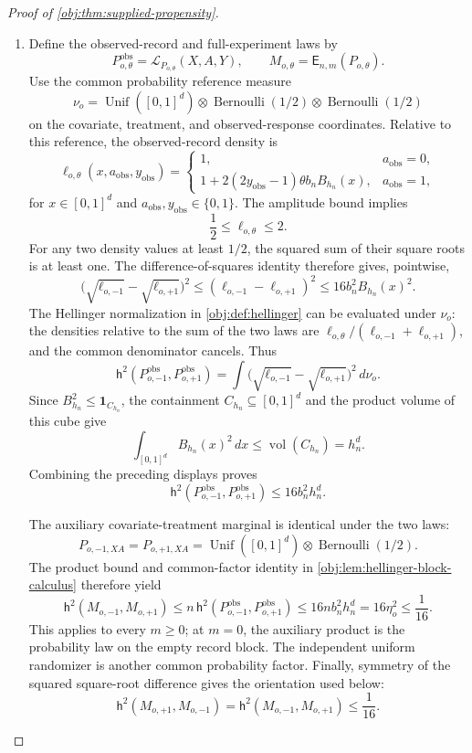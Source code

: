 \documentclass[11pt]{article}
\begin{document}
\begin{proof}[Proof of \cref{obj:thm:supplied-propensity}]
\begin{enumerate}
\item Define the observed-record and full-experiment laws by
\[
P_{o,\theta}^{\mathrm{obs}}
=\mathcal L_{P_{o,\theta}}(X,A,Y),
\qquad
M_{o,\theta}=\mathsf E_{n,m}(P_{o,\theta}).
\]
Use the common probability reference measure
\[
\nu_o
=
\operatorname{Unif}([0,1]^d)
\otimes\operatorname{Bernoulli}(1/2)
\otimes\operatorname{Bernoulli}(1/2)
\]
on the covariate, treatment, and observed-response coordinates. Relative to this reference, the observed-record density is
\[
\ell_{o,\theta}(x,a_{\mathrm{obs}},y_{\mathrm{obs}})
=
\begin{cases}
1,&a_{\mathrm{obs}}=0,\\
1+2(2y_{\mathrm{obs}}-1)\theta b_nB_{h_n}(x),
&a_{\mathrm{obs}}=1,
\end{cases}
\]
for \(x\in[0,1]^d\) and \(a_{\mathrm{obs}},y_{\mathrm{obs}}\in\{0,1\}\). The amplitude bound implies
\[
\frac12\le\ell_{o,\theta}\le2.
\]
For any two density values at least \(1/2\), the squared sum of their square roots is at least one. The difference-of-squares identity therefore gives, pointwise,
\[
\bigl(\sqrt{\ell_{o,-1}}-\sqrt{\ell_{o,+1}}\bigr)^2
\le
(\ell_{o,-1}-\ell_{o,+1})^2
\le16b_n^2B_{h_n}(x)^2.
\]
The Hellinger normalization in \cref{obj:def:hellinger} can be evaluated under \(\nu_o\): the densities relative to the sum of the two laws are
\(\ell_{o,\theta}/(\ell_{o,-1}+\ell_{o,+1})\), and the common denominator cancels. Thus
\[
\mathsf h^2(P_{o,-1}^{\mathrm{obs}},P_{o,+1}^{\mathrm{obs}})
=
\int
\bigl(\sqrt{\ell_{o,-1}}-\sqrt{\ell_{o,+1}}\bigr)^2\,d\nu_o.
\]
Since \(B_{h_n}^2\le\mathbf1_{C_{h_n}}\), the containment
\(C_{h_n}\subseteq[0,1]^d\) and the product volume of this cube give
\[
\int_{[0,1]^d}B_{h_n}(x)^2\,dx
\le\operatorname{vol}(C_{h_n})
=h_n^d.
\]
Combining the preceding displays proves
\[
\mathsf h^2(P_{o,-1}^{\mathrm{obs}},P_{o,+1}^{\mathrm{obs}})
\le16b_n^2h_n^d.
\]

The auxiliary covariate-treatment marginal is identical under the two laws:
\[
P_{o,-1,XA}=P_{o,+1,XA}
=
\operatorname{Unif}([0,1]^d)\otimes\operatorname{Bernoulli}(1/2).
\]
The product bound and common-factor identity in
\cref{obj:lem:hellinger-block-calculus} therefore yield
\[
\mathsf h^2(M_{o,-1},M_{o,+1})
\le
n\,\mathsf h^2(P_{o,-1}^{\mathrm{obs}},P_{o,+1}^{\mathrm{obs}})
\le16n b_n^2h_n^d
=16\eta_o^2
\le\frac1{16}.
\]
This applies to every \(m\ge0\); at \(m=0\), the auxiliary product is the probability law on the empty record block. The independent uniform randomizer is another common probability factor. Finally, symmetry of the squared square-root difference gives the orientation used below:
\[
\mathsf h^2(M_{o,+1},M_{o,-1})
=
\mathsf h^2(M_{o,-1},M_{o,+1})
\le\frac1{16}.
\]


\end{enumerate}
\end{proof}
\end{document}
